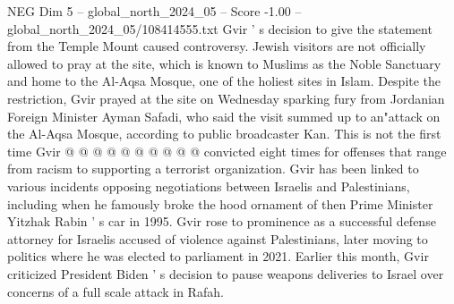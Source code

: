 \begin{textsample}{NEG Dim 5 – global\_north\_2024\_05 – Score -1.00 – global\_north\_2024\_05/108414555.txt}
Gvir ' s decision to give the statement from the Temple Mount caused controversy.
Jewish visitors are not officially allowed to pray at the site, which is known to Muslims as the Noble Sanctuary and home to the Al-Aqsa Mosque, one of the holiest sites in Islam.
Despite the restriction, Gvir prayed at the site on Wednesday sparking fury from Jordanian Foreign Minister Ayman Safadi, who said the visit summed up to an"attack on the Al-Aqsa Mosque, according to public broadcaster Kan.
This is not the first time Gvir @ @ @ @ @ @ @ @ @ @ convicted eight times for offenses that range from racism to supporting a terrorist organization.
Gvir has been linked to various incidents opposing negotiations between Israelis and Palestinians, including when he famously broke the hood ornament of then Prime Minister Yitzhak Rabin ' s car in 1995.
Gvir rose to prominence as a successful defense attorney for Israelis accused of violence against Palestinians, later moving to politics where he was elected to parliament in 2021.
Earlier this month, Gvir criticized President Biden ' s decision to pause weapons deliveries to Israel over concerns of a full scale attack in Rafah.

\end{textsample}
